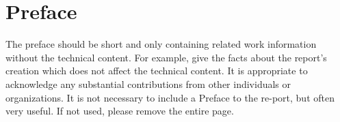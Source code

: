 
\clearpage


\pagestyle{fancy}
\fancyhead{} %

\section*{Preface}
The preface should be short and only containing related work information without the technical content. For example, give the facts about the report's creation which does not affect the technical content. It is appropriate to acknowledge any substantial contributions from other individuals or organizations. It is not necessary to include a Preface to the re-port, but often very useful. If not used, please remove the entire page.

\begin{comment}
To write notes or comments that isn't published in the pdf.
\end{comment}